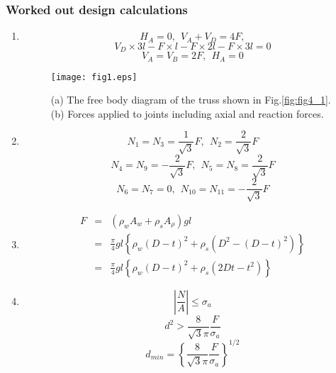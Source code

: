 \documentclass[10pt,a4j]{article}
\begin{document}
\subsubsection{Worked out design calculations}
\begin{enumerate}
\item
\begin{equation}
	H_A=0, \ \ V_A+V_D=4F, 
	\label{eqn:}
\end{equation}
\begin{equation}
	V_D\times 3l - F\times l-F\times 2l-F\times 3l=0
	\label{eqn:}
\end{equation}
\begin{equation}
	V_A=V_B=2F, \ \ H_A=0
	\label{eqn:}
\end{equation}
\begin{figure}[h]
	\begin{center}
	\texttt{[image: fig1.eps]} 
	\end{center}
	\caption{(a) The free body diagram of the truss shown in Fig.\ref{fig:fig4_1}. 
	(b) Forces applied to joints including axial and reaction forces.} 
	\label{fig:fig1}
\end{figure}
\item
	\[
		N_1=N_3=\frac{1}{\sqrt{3}}F ,\ \ N_2=\frac{2}{\sqrt{3}}F
	\]
	\[
		N_4=N_9=-\frac{2}{\sqrt{3}}F ,\ \ N_5=N_8=\frac{2}{\sqrt{3}}F
	\]
	\[
		N_6=N_7=0, \ \ N_{10}=N_{11}=-\frac{2}{\sqrt{3}}F
	\]
\item
\begin{eqnarray}
	F &=& 
	\left( \rho_w A_w + \rho_s A_\rho \right)gl \nonumber \\
	&= & 
	\frac{\pi}{4}gl
	\left\{ 
		\rho_w(D-t)^2+ \rho_s\left(D^2-(D-t)^2\right)
	\right\}
	\nonumber \\
	&=&
	\frac{\pi}{4}gl
	\left\{ 
		\rho_w(D-t)^2+ \rho_s\left(2Dt-t^2\right)
	\right\}
	\label{eqn:}
\end{eqnarray}
\item
\begin{equation}
	\left| \frac{N}{A}\right| \leq \sigma_a
	\label{eqn:}
\end{equation}
\begin{equation}
	d^2 > \frac{8}{\sqrt{3}\pi} \frac{F}{\sigma_a}
	\label{eqn:}
\end{equation}
\begin{equation}
	d_{min}=
	\left\{ \frac{8}{\sqrt{3}\pi} \frac{F}{\sigma_a}
	\right\}^{1/2}
	\label{eqn:}
\end{equation}
\end{enumerate}
\end{document}
